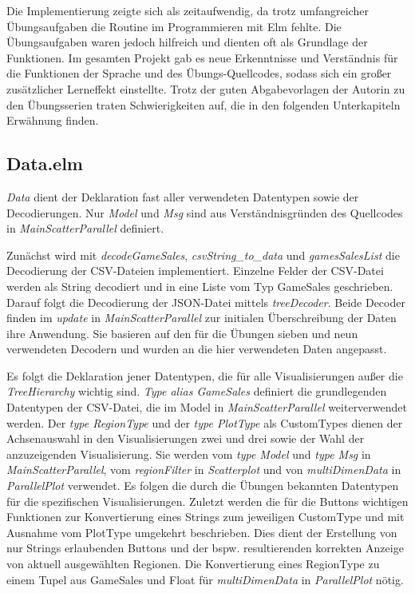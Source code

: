 \documentclass[usegeometry=true]{scrartcl}
\begin{document}
Die Implementierung zeigte sich als zeitaufwendig, da trotz umfangreicher Übungsaufgaben die Routine im Programmieren mit Elm fehlte.
Die Übungsaufgaben waren jedoch hilfreich und dienten oft als Grundlage der Funktionen.
Im gesamten Projekt gab es neue Erkenntnisse und Verständnis für die Funktionen der Sprache und des Übungs-Quellcodes, 
sodass sich ein großer zusätzlicher Lerneffekt einstellte.
Trotz der guten Abgabevorlagen der Autorin zu den Übungsserien traten Schwierigkeiten auf, 
die in den folgenden Unterkapiteln Erwähnung finden.
          
\subsection{Data.elm}
\textit{Data} dient der Deklaration fast aller verwendeten Datentypen sowie der Decodierungen. 
Nur \textit{Model} und \textit{Msg} sind aus Verständnisgründen des Quellcodes in \textit{MainScatterParallel} definiert. 

Zunächst wird mit \textit{decodeGameSales}, \textit{csvString\_to\_data} und \textit{gamesSalesList} die Decodierung der CSV-Dateien implementiert. 
Einzelne Felder der CSV-Datei werden als String decodiert und in eine Liste vom Typ GameSales geschrieben.
Darauf folgt die Decodierung der JSON-Datei mittels \textit{treeDecoder}.
Beide Decoder finden im \textit{update} in \textit{MainScatterParallel} zur initialen Überschreibung der Daten ihre Anwendung.
Sie basieren auf den für die Übungen sieben und neun verwendeten Decodern und wurden an die hier verwendeten Daten angepasst.

Es folgt die Deklaration jener Datentypen, die für alle Visualisierungen außer die \textit{TreeHierarchy} wichtig sind. 
\textit{Type alias GameSales} definiert die grundlegenden Datentypen der CSV-Datei, die im Model in \textit{MainScatterParallel} weiterverwendet werden. 
Der \textit{type RegionType} und der \textit{type PlotType} als CustomTypes dienen der Achsenauswahl in den Visualisierungen zwei und drei 
sowie der Wahl der anzuzeigenden Visualisierung. 
Sie werden vom \textit{type Model} und \textit{type Msg} in \textit{MainScatterParallel}, vom \textit{regionFilter} in \textit{Scatterplot} 
und von \textit{multiDimenData} in \textit{ParallelPlot} verwendet. 
Es folgen die durch die Übungen bekannten Datentypen für die spezifischen Visualisierungen. 
Zuletzt werden die für die Buttons wichtigen Funktionen zur Konvertierung eines Strings zum jeweiligen CustomType 
und mit Ausnahme vom PlotType umgekehrt beschrieben. 
Dies dient der Erstellung von nur Strings erlaubenden Buttons und der bspw. resultierenden korrekten Anzeige von aktuell ausgewählten Regionen.
Die Konvertierung eines RegionType zu einem Tupel aus GameSales und Float für \textit{multiDimenData} in \textit{ParallelPlot} nötig.
\end{document}

